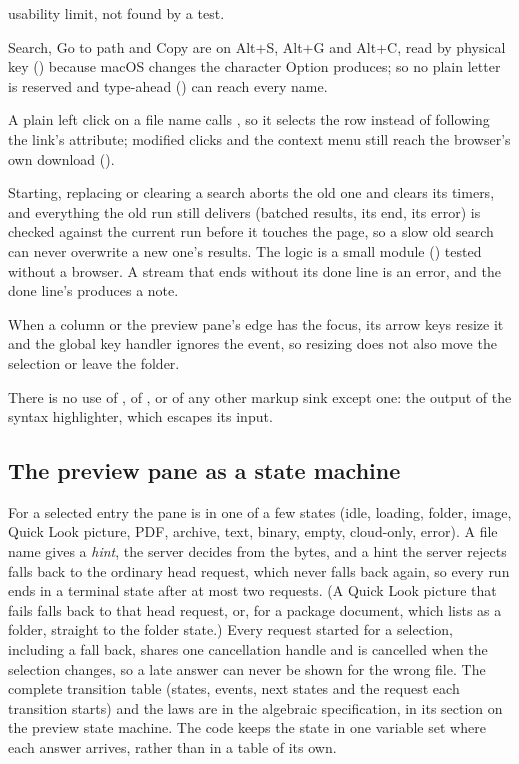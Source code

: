 \begin{description}
        usability limit, not found by a test.
  \item[Every letter types ahead.]  Search, Go to path and Copy are on Alt+S, Alt+G and
        Alt+C, read by physical key () because macOS changes the
        character Option produces; so no plain letter is reserved and type-ahead
        () can reach every name.
  \item[A click selects.]  A plain left click on a file name calls , so
        it selects the row instead of following the link's  attribute;
        modified clicks and the context menu still reach the browser's own download
        ().
  \item[A search belongs to one run.]  Starting, replacing or clearing a search aborts the old
        one and clears its timers, and everything the old run still delivers (batched results,
        its end, its error) is checked against the current run before it touches the page, so a
        slow old search can never overwrite a new one's results.  The logic is a small module
        () tested without a browser.  A stream that ends without its done line
        is an error, and the done line's  produces a note.
  \item[A resize handle keeps its keys.]  When a column or the preview pane's edge has the
        focus, its arrow keys resize it and the global key handler ignores the event, so
        resizing does not also move the selection or leave the folder.
  \item[No dynamic code.]  There is no use of , of , or of any
        other markup sink except one: the output of the syntax highlighter, which escapes its
        input.
\end{description}

\subsection{The preview pane as a state machine}

For a selected entry the pane is in one of a few states (idle, loading, folder, image, Quick
Look picture, PDF, archive, text, binary, empty, cloud-only, error).  A file name gives a \emph{hint}, the
server decides from the bytes, and a hint the server rejects falls back to the ordinary head
request, which never falls back again, so every run ends in a terminal state after at most two
requests.  (A Quick Look picture that fails falls back to that head request, or, for a package
document, which lists as a folder, straight to the folder state.)  Every request started for a selection, including a fall back, shares one
cancellation handle and is cancelled when the selection changes, so a late answer can never be
shown for the wrong file.  The complete transition table (states, events, next states and the
request each transition starts) and the laws are in the algebraic specification, in its
section on the preview state machine.  The code keeps the state in one variable set where each
answer arrives, rather than in a table of its own.

